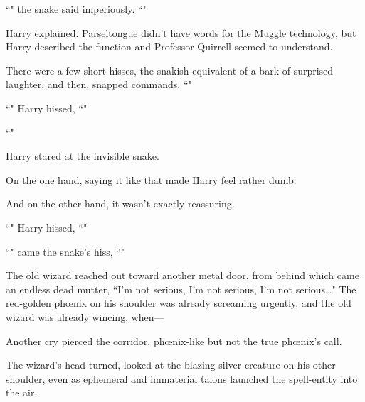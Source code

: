 ``" the snake said imperiously. ``"

Harry explained. Parseltongue didn't have words for the Muggle technology, but Harry described the function and Professor Quirrell seemed to understand.

There were a few short hisses, the snakish equivalent of a bark of surprised laughter, and then, snapped commands. ``"

``" Harry hissed, ``"

``"

Harry stared at the invisible snake.

On the one hand, saying it like that made Harry feel rather dumb.

And on the other hand, it wasn't exactly reassuring.

``" Harry hissed, ``"

``" came the snake's hiss, ``"

\later

The old wizard reached out toward another metal door, from behind which came an endless dead mutter, ``I'm not serious, I'm not serious, I'm not serious{\ldots}" The red-golden phœnix on his shoulder was already screaming urgently, and the old wizard was already wincing, when—

Another cry pierced the corridor, phœnix-like but not the true phœnix's call.

The wizard's head turned, looked at the blazing silver creature on his other shoulder, even as ephemeral and immaterial talons launched the spell-entity into the air.

